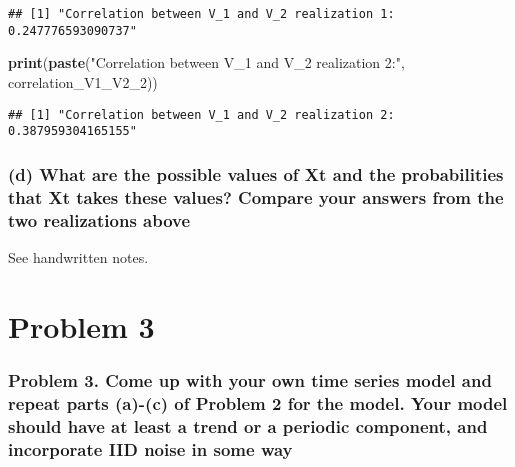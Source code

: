 \documentclass[
]{article}
\newenvironment{Shaded}{\begin{snugshade}}{\end{snugshade}}
\newcommand{\FunctionTok}[1]{\textcolor[rgb]{0.13,0.29,0.53}{\textbf{#1}}}
\newcommand{\NormalTok}[1]{#1}
\newcommand{\StringTok}[1]{\textcolor[rgb]{0.31,0.60,0.02}{#1}}
\begin{document}
\begin{verbatim}
## [1] "Correlation between V_1 and V_2 realization 1: 0.247776593090737"
\end{verbatim}

\begin{Shaded}
\begin{Highlighting}[]
\FunctionTok{print}\NormalTok{(}\FunctionTok{paste}\NormalTok{(}\StringTok{"Correlation between V\_1 and V\_2 realization 2:"}\NormalTok{, correlation\_V1\_V2\_2))}
\end{Highlighting}
\end{Shaded}

\begin{verbatim}
## [1] "Correlation between V_1 and V_2 realization 2: 0.387959304165155"
\end{verbatim}

\hypertarget{d-what-are-the-possible-values-of-xt-and-the-probabilities-that-xt-takes-these-values-compare-your-answers-from-the-two-realizations-above}{%
\subsubsection{(d) What are the possible values of Xt and the
probabilities that Xt takes these values? Compare your answers from the
two realizations
above}\label{d-what-are-the-possible-values-of-xt-and-the-probabilities-that-xt-takes-these-values-compare-your-answers-from-the-two-realizations-above}}

See handwritten notes.

\hypertarget{problem-3}{%
\section{Problem 3}\label{problem-3}}

\hypertarget{problem-3.-come-up-with-your-own-time-series-model-and-repeat-parts-a-c-of-problem-2-for-the-model.-your-model-should-have-at-least-a-trend-or-a-periodic-component-and-incorporate-iid-noise-in-some-way}{%
\subsubsection{Problem 3. Come up with your own time series model and
repeat parts (a)-(c) of Problem 2 for the model. Your model should have
at least a trend or a periodic component, and incorporate IID noise in
some
way}\label{problem-3.-come-up-with-your-own-time-series-model-and-repeat-parts-a-c-of-problem-2-for-the-model.-your-model-should-have-at-least-a-trend-or-a-periodic-component-and-incorporate-iid-noise-in-some-way}}
\end{document}
